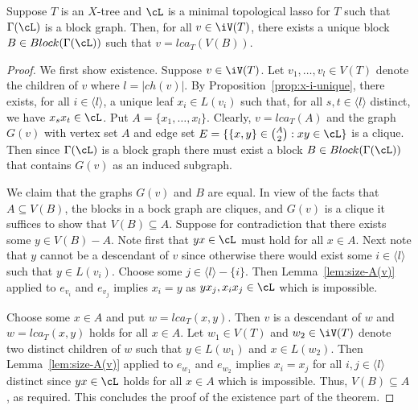 \begin{thm}\label{theo:unique-block}
  Suppose $T$ is an $X$-tree and $\cL$ is a minimal topological lasso for $T$
  such that $\Gamma(\cL)$ is a block graph. Then, for all $v\in \iV(T)$, there
  exists a unique block $B\in Block(\Gamma(\cL))$ such that $v=lca_T(V(B))$.
\end{thm}
\begin{proof}
  We first show existence. Suppose $v\in \iV(T)$. Let $v_1,\ldots,v_l\in V(T)$
  denote the children of $v$ where $l=|ch(v)|$.  By
  Proposition~\ref{prop:x-i-unique}, there exists, for all $i\in\langle
  l\rangle$, a unique leaf $x_i\in L(v_i)$ such that, for all $s,t\in \langle
  l\rangle$ distinct, we have $x_sx_t\in \cL$. Put $A=\{x_1,\ldots,x_l\}$.
  Clearly, $v=lca_T(A)$ and the graph $G(v)$ with vertex set $A$ and edge set
  $E=\{\{x,y\}\in {A\choose 2}: xy\in\cL\}$ is a clique.  Then since
  $\Gamma(\cL)$ is a block graph there must exist a block $B\in
  Block(\Gamma(\cL))$ that contains $G(v)$ as an induced subgraph.

  We claim that the graphs $G(v)$ and $B$ are equal.  In view of the facts
  that $A\subseteq V(B)$, the blocks in a bock graph are cliques, and $G(v)$
  is a clique it suffices to show that $V(B)\subseteq A$. Suppose for
  contradiction that there exists some $y\in V(B)-A$. Note first that $yx\in
  \cL$ must hold for all $x\in A$.  Next note that $y$ cannot be a descendant
  of $v$ since otherwise there would exist some $i\in\langle l\rangle$ such
  that $y\in L(v_i)$. Choose some $j\in \langle l\rangle-\{i\}$. Then
  Lemma~\ref{lem:size-A(v)} applied to $e_{v_i}$ and $e_{v_j}$
  implies $x_i=y$ as $yx_j,x_ix_j\in\cL$ which is impossible.

  Choose some $x\in A$ and put $w=lca_T(x,y)$. Then $v$ is a descendant of $w$
  and $w=lca_T(x,y)$ holds for all $x\in A$. Let $w_1\in V(T)$ and $w_2\in
  \iV(T)$ denote two distinct children of $w$ such that $y\in L(w_1)$ and
  $x\in L(w_2)$. Then Lemma~\ref{lem:size-A(v)} applied to $e_{w_1}$ and
  $e_{w_2}$
  implies $x_i=x_j$ for all $i,j\in\langle l\rangle$ distinct since $yx\in\cL$
  holds for all $x\in A$ which is impossible.  Thus, $V(B)\subseteq A$, as
  required. This concludes the proof of the existence part of the theorem.


\end{proof}
